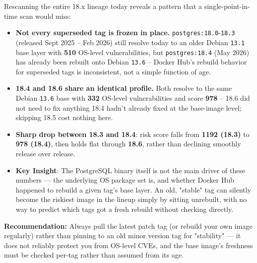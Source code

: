 \documentclass[11pt, a4paper]{article}
\begin{document}
\begin{tcolorbox}[colback=lightorange!20, colframe=vuln-high, title=📊 Patch Release Analysis: 18.0 $\rightarrow$ 18.6 Trend, fonttitle=\bfseries]
Rescanning the entire 18.x lineage today reveals a pattern that a single-point-in-time scan would miss:
\begin{itemize}
    \item \textbf{Not every superseded tag is frozen in place.} \texttt{postgres:18.0}-\texttt{18.3} (released Sept 2025 -- Feb 2026) still resolve today to an older Debian \texttt{13.1} base layer with \textbf{510} OS-level vulnerabilities, but \texttt{postgres:18.4} (May 2026) has already been rebuilt onto Debian \texttt{13.6} -- Docker Hub's rebuild behavior for superseded tags is inconsistent, not a simple function of age.
    \item \textbf{18.4 and 18.6 share an identical profile.} Both resolve to the same Debian \texttt{13.6} base with \textbf{332} OS-level vulnerabilities and score \textbf{978} -- 18.6 did not need to fix anything 18.4 hadn't already fixed at the base-image level; skipping 18.5 cost nothing here.
    \item \textbf{Sharp drop between 18.3 and 18.4}: risk score falls from \textbf{1192 (18.3)} to \textbf{978 (18.4)}, then holds flat through \textbf{18.6}, rather than declining smoothly release over release.
    \item \textbf{Key Insight}: The PostgreSQL binary itself is not the main driver of these numbers --- the underlying OS package set is, and whether Docker Hub happened to rebuild a given tag's base layer. An old, "stable" tag can silently become the riskiest image in the lineup simply by sitting unrebuilt, with no way to predict which tags got a fresh rebuild without checking directly.
\end{itemize}
\textbf{Recommendation:} Always pull the latest patch tag (or rebuild your own image regularly) rather than pinning to an old minor version tag for "stability" --- it does not reliably protect you from OS-level CVEs, and the base image's freshness must be checked per-tag rather than assumed from its age.
\end{tcolorbox}
\end{document}
